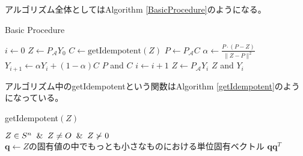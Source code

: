 アルゴリズム全体としてはAlgorithm \ref{BasicProcedure}のようになる。
\begin{algorithm}
  \caption{Basic Procedure}
  \label{BasicProcedure}
  \begin{algorithmic}[1]
    \State $i \leftarrow 0$
    \State $Z \leftarrow P_\mathcal{A} Y_0$
      \State $C \leftarrow \text{getIdempotent}\left(Z\right)$
      \State $P \leftarrow P_\mathcal{A} C$
        \State $\alpha \leftarrow \displaystyle{\frac{P \cdot \left(P - Z\right)}{\|Z - P\|^2}}$
        \State $Y_{i + 1} \leftarrow \alpha Y_i + \left(1 - \alpha\right) C$
      \Else
        \State \Return $P$ and $C$
      \EndIf
      \State $i \leftarrow i + 1$
      \State $Z \leftarrow P_\mathcal{A} Y_i$
    \EndWhile
    \State \Return $Z$ and $Y_i$
  \end{algorithmic}
\end{algorithm}

アルゴリズム中のgetIdempotentという関数はAlgorithm \ref{getIdempotent}のようになっている。
\begin{algorithm}
  \caption{getIdempotent$\left(Z\right)$}
  \label{getIdempotent}
  \begin{algorithmic}[1]
    \Input $Z \in S^n \And Z \not= O \And Z \not\succ 0$
    \State $\mathbf{q} \leftarrow Z\text{の固有値の中でもっとも小さなものにおける単位固有ベクトル}$
    \State \Return $\mathbf{q} \mathbf{q}^T$
  \end{algorithmic}
\end{algorithm}

